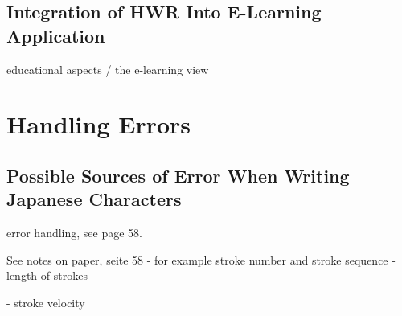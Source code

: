 \subsection{Integration of HWR Into E-Learning Application}
educational aspects / the e-learning view

\section{Handling Errors}
\label{sec:concept:handlingerrors}




\subsection[Sources of Error]{Possible Sources of Error When Writing Japanese Characters}
\label{sec:concept:sourcesoferror}

error handling, see page 58.


See notes on paper, seite 58
- for example stroke number and stroke sequence
- length of strokes

- stroke velocity